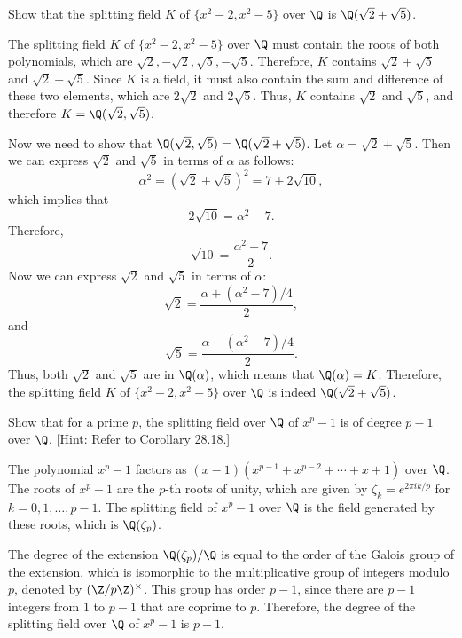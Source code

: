 \begin{problem}[44.26]
  Show that the splitting field $K$ of $\{x^2 - 2, x^2 - 5\}$ over $\Q$ is $\Q(\sqrt{2} + \sqrt{5})$.
\end{problem}

\begin{solution}
  The splitting field $K$ of $\{x^2 - 2, x^2 - 5\}$ over $\Q$ must contain the roots of both polynomials, which are $\sqrt{2}, -\sqrt{2}, \sqrt{5}, -\sqrt{5}$. Therefore, $K$ contains $\sqrt{2} + \sqrt{5}$ and $\sqrt{2} - \sqrt{5}$. Since $K$ is a field, it must also contain the sum and difference of these two elements, which are $2\sqrt{2}$ and $2\sqrt{5}$. Thus, $K$ contains $\sqrt{2}$ and $\sqrt{5}$, and therefore $K = \Q(\sqrt{2}, \sqrt{5})$. 

  Now we need to show that $\Q(\sqrt{2}, \sqrt{5}) = \Q(\sqrt{2} + \sqrt{5})$. Let $\alpha = \sqrt{2} + \sqrt{5}$. Then we can express $\sqrt{2}$ and $\sqrt{5}$ in terms of $\alpha$ as follows:
  \[
    \alpha^2 = (\sqrt{2} + \sqrt{5})^2 = 7 + 2\sqrt{10}
  ,\]%
  which implies that
  \[
    2\sqrt{10} = \alpha^2 - 7
  .\]%
  Therefore,
  \[
    \sqrt{10} = \frac{\alpha^2 - 7}{2}
  .\]%
  Now we can express $\sqrt{2}$ and $\sqrt{5}$ in terms of $\alpha$:
  \[
    \sqrt{2} = \frac{\alpha + (\alpha^2 - 7)/4}{2}
  ,\]%
  and
  \[
    \sqrt{5} = \frac{\alpha - (\alpha^2 - 7)/4}{2}
  .\]%
  Thus, both $\sqrt{2}$ and $\sqrt{5}$ are in $\Q(\alpha)$, which means that $\Q(\alpha) = K$. Therefore, the splitting field $K$ of $\{x^2 - 2, x^2 - 5\}$ over $\Q$ is indeed $\Q(\sqrt{2} + \sqrt{5})$.
\end{solution}

\begin{problem}[44.30]
  Show that for a prime $p$, the splitting field over $\Q$ of $x^p - 1$ is of degree $p - 1$ over $\Q$. [Hint: Refer to Corollary 28.18.]
\end{problem}

\begin{solution}
  The polynomial $x^p - 1$ factors as $(x - 1)(x^{p-1} + x^{p-2} + \cdots + x + 1)$ over $\Q$. The roots of $x^p - 1$ are the $p$-th roots of unity, which are given by $\zeta_k = e^{2\pi i k/p}$ for $k = 0, 1, \dots, p-1$. The splitting field of $x^p - 1$ over $\Q$ is the field generated by these roots, which is $\Q(\zeta_p)$.

  The degree of the extension $\Q(\zeta_p)/\Q$ is equal to the order of the Galois group of the extension, which is isomorphic to the multiplicative group of integers modulo $p$, denoted by $(\Z/p\Z)^\times$. This group has order $p - 1$, since there are $p - 1$ integers from $1$ to $p - 1$ that are coprime to $p$. Therefore, the degree of the splitting field over $\Q$ of $x^p - 1$ is $p - 1$.
\end{solution}

